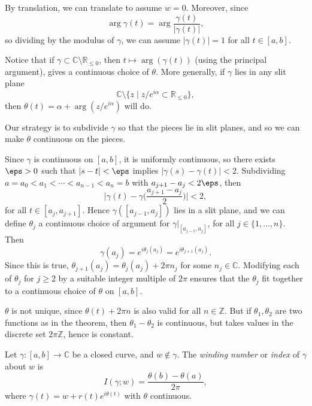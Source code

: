 \documentclass[12pt]{article}
\begin{document}
\begin{proofbox}
	By translation, we can translate to assume $w = 0$. Moreover, since
	\[
	\arg \gamma(t) = \arg \frac{\gamma(t)}{|\gamma(t)|}
	,\]
	so dividing by the modulus of $\gamma$, we can assume $|\gamma(t)| = 1$ for all $t \in [a, b]$.

	Notice that if $\gamma \subset \mathbb{C} \setminus \mathbb{R}_{\leq 0}$, then $t \mapsto \arg (\gamma(t))$ (using the principal argument), gives a continuous choice of $\theta$. More generally, if $\gamma$ lies in any slit plane
	\[
		\mathbb{C} \setminus \{ z \mid z/e^{i\alpha} \subset \mathbb{R}_{\leq 0}\}
	,\]
	then $\theta(t) = \alpha + \arg(z/e^{i\alpha})$ will do.

	Our strategy is to subdivide $\gamma$ so that the pieces lie in slit planes, and so we can make $\theta$ continuous on the pieces.

	Since $\gamma$ is continuous on $[a, b]$, it is uniformly continuous, so there exists $\eps > 0$ such that $|s - t| < \eps$ implies $|\gamma(s) - \gamma(t)| < 2$. Subdividing $a = a_0 < a_1 < \cdots < a_{n-1} < a_n = b$ with $a_{j+1} - a_{j} < 2 \eps$, then
	\[
	\biggl| \gamma(t) - \gamma \biggl( \frac{a_{j+1} - a_j}{2} \biggr) \biggr| < 2
	,\]
	for all $t \in [a_{j}, a_{j+1}]$. Hence $\gamma([a_{j-1}, a_j])$ lies in a slit plane, and we can define $\theta_j$ a continuous choice of argument for $\gamma|_{[a_{j-1}, a_j]}$, for all $j \in \{1, \ldots, n\}$. Then
	\[
	\gamma(a_j) = e^{i \theta_j (a_j)} = e^{i \theta_{j+1}(a_j)}
	.\]
	Since this is true, $\theta_{j+1}(a_j) = \theta_j(a_j) + 2 \pi n_j$ for some $n_j \in \mathbb{C}$. Modifying each of $\theta_j$ for $j \geq 2$ by a suitable integer multiple of $2 \pi$ ensures that the $\theta_j$ fit together to a continuous choice of $\theta$ on $[a, b]$.
\end{proofbox}
\begin{remark}
	$\theta$ is not unique, since $\theta(t) + 2 \pi n$ is also valid for all $n \in \mathbb{Z}$. But if $\theta_1, \theta_2$ are two functions as in the theorem, then $\theta_1 - \theta_2$ is continuous, but takes values in the discrete set $2 \pi \mathbb{Z}$, hence is constant.
\end{remark}

\begin{definition}
	Let $\gamma : [a, b] \to \mathbb{C}$ be a closed curve, and $w \not \in \gamma$. The \emph{winding number} or \emph{index} of $\gamma$ about $w$ is
	\[
	I(\gamma;w) = \frac{\theta(b) - \theta(a)}{2 \pi}
	,\]
	where $\gamma(t) = w + r(t) e^{i \theta(t)}$ with $\theta$ continuous.
\end{definition}
\end{document}
